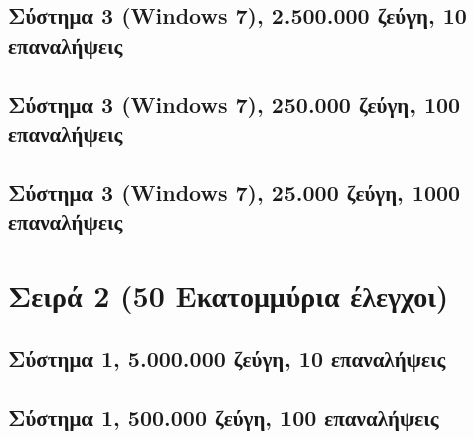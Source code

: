 \subsection*{Σύστημα 3 (Windows 7), 2.500.000 ζεύγη, 10 επαναλήψεις}
\begin{center}
\tabcolsep=0.11cm
\scalebox{0.5}{
}
\scalebox{0.9}{
}\end{center}
\newpage

\subsection*{Σύστημα 3 (Windows 7), 250.000 ζεύγη, 100 επαναλήψεις}\begin{center}
\tabcolsep=0.11cm
\scalebox{0.5}{
}
\scalebox{0.9}{
}\end{center}
\newpage

\subsection*{Σύστημα 3 (Windows 7), 25.000 ζεύγη, 1000 επαναλήψεις}\begin{center}
\tabcolsep=0.11cm
\scalebox{0.5}{
}
\scalebox{0.9}{
}\end{center}
\newpage

\section{Σειρά 2 (50 Εκατομμύρια έλεγχοι)}

\subsection*{Σύστημα 1, 5.000.000 ζεύγη, 10 επαναλήψεις}
\begin{center}
\tabcolsep=0.11cm
\scalebox{0.55}{}
\scalebox{0.9}{
}\end{center}
\newpage

\subsection*{Σύστημα 1, 500.000 ζεύγη, 100 επαναλήψεις}\begin{center}
\tabcolsep=0.11cm
\scalebox{0.5}{
}
\scalebox{0.9}{
}\end{center}
\newpage

